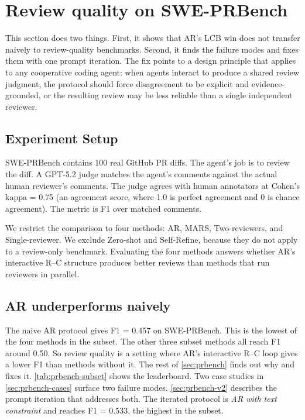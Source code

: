 \documentclass{article}
\begin{document}
\section{Review quality on SWE-PRBench}
\label{sec:prbench}
This section does two things. First, it shows that AR's LCB win
does not transfer naively to review-quality benchmarks. Second, it
finds the failure modes and fixes them with one prompt iteration. The
fix points to a design principle that applies to any cooperative coding agent: when agents interact to produce a shared review judgment, the protocol should force disagreement to be explicit and evidence-grounded, or the resulting review may be less reliable than a single independent reviewer.

\subsection{Experiment Setup}
\label{sec:prbench-setup}

SWE-PRBench \citep{swe-prbench2026} contains 100 real GitHub PR diffs.
The agent's job is to review the diff. A GPT-5.2 judge matches the
agent's comments against the actual human reviewer's comments. The
judge agrees with human annotators at Cohen's kappa = 0.75 (an agreement score, where 1.0 is perfect agreement and
0 is chance agreement). The metric is F1 over matched comments.

We restrict the comparison to four methods: AR, MARS, Two-reviewers,
and Single-reviewer. We exclude Zero-shot and Self-Refine, because they
do not apply to a review-only benchmark. 
Evaluating the four methods answers whether AR's
interactive R--C structure produces better reviews than methods that run reviewers in parallel.

\subsection{AR underperforms naively}
\label{sec:prbench-headline}

The naive AR protocol gives F1 = 0.457
on SWE-PRBench. This is the lowest of the four methods in the subset.
The other three subset methods all reach F1 around 0.50. So review
quality is a setting where AR's interactive R--C loop gives a lower F1
than methods without it. The rest of \autoref{sec:prbench} finds out
why and fixes it. \autoref{tab:prbench-subset} shows the leaderboard. Two case studies in
\autoref{sec:prbench-cases} surface two failure modes. \autoref{sec:prbench-v2}
describes the prompt iteration that addresses both. The iterated protocol is
\emph{AR with text constraint} and reaches F1 = 0.533, the highest in the subset.
\end{document}

